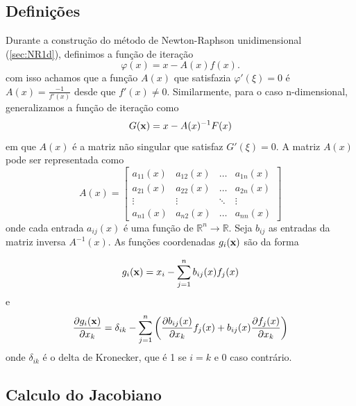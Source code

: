 \subsection{Definições}

Durante a construção do método de Newton-Raphson unidimensional
(\ref{sec:NR1d}), definimos a função de iteração
\begin{equation*}
    \varphi(x) = x - {A(x)}{f(x)}.
\end{equation*}
com isso achamos que a função \(A(x)\) que satisfazia \(\varphi'(\xi) = 0\) é \(A(x) = \frac{-1}{f'(x)}\) desde que \(f'(x) \neq 0\).
Similarmente, para o caso n-dimensional, generalizamos a função de iteração como
\begin{equation*}
    G(\textbf{x}) = x - A(x)^{-1} F(x)
\end{equation*}
em que \(A(x)\) é a matriz não singular que satisfaz \(G'(\xi) = 0\). A matriz \(A(x)\) pode ser representada como
\begin{equation}\label{matA}
    A(x) =
    \begin{bmatrix}
        a_{11}(x) & a_{12}(x) & \ldots & a_{1n}(x) \\
        a_{21}(x) & a_{22}(x) & \ldots & a_{2n}(x) \\
        \vdots    & \vdots    & \ddots & \vdots    \\
        a_{n1}(x) & a_{n2}(x) & \ldots & a_{nn}(x)
    \end{bmatrix}
\end{equation}
onde cada entrada  \(a_{ij}(x)\) é uma função de   \(\mathbb{R}^n \rightarrow  \mathbb{R}\). Seja \(b_{ij}\) as entradas da matriz inversa \(A^{-1}(x)\). As funções coordenadas  $g_{i}(\textbf{x})$ são da forma

\begin{equation}
    g_{i}(\textbf{x}) = x_i - \sum_{j=1}^{n} b_{ij}(x) f_j(x)
\end{equation}
e
\begin{equation}\label{sumInvA}
    \frac{\partial g_i(\textbf{x})}{\partial x_k} = \delta_{ik} - \sum_{j=1}^{n} \left( \frac{\partial b_{ij}(x)}{\partial x_k} f_j(x) + b_{ij}(x) \frac{\partial f_j(x)}{\partial x_k} \right)
\end{equation}
onde \(\delta_{ik}\) é o delta de Kronecker, que é 1 se \(i = k\) e 0 caso contrário.

\subsection{Calculo do Jacobiano}


